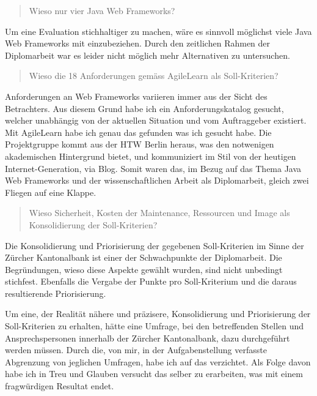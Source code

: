 \begin{quote}\begin{itshape}Wieso nur vier Java Web
Frameworks?\end{itshape}\end{quote}

Um eine Evaluation stichhaltiger zu machen, wäre es sinnvoll möglichst viele
Java Web Frameworks mit einzubeziehen. Durch den zeitlichen Rahmen der
Diplomarbeit war es leider nicht möglich mehr Alternativen zu untersuchen.
\newline

\begin{quote}\begin{itshape}Wieso die 18 Anforderungen gemäss AgileLearn als
Soll-Kriterien?\end{itshape}\end{quote}

Anforderungen an Web Frameworks variieren immer aus der Sicht des Betrachters.
Aus diesem Grund habe ich ein Anforderungskatalog gesucht, welcher unabhängig
von der aktuellen Situation und vom Auftraggeber existiert. Mit AgileLearn habe
ich genau das gefunden was ich gesucht habe. Die Projektgruppe kommt aus der HTW
Berlin heraus, was den notwenigen akademischen Hintergrund bietet, und
kommuniziert im Stil von der heutigen Internet-Generation, via Blog. Somit waren
das, im Bezug auf das Thema Java Web Frameworks und der wissenschaftlichen
Arbeit als Diplomarbeit, gleich zwei Fliegen auf eine Klappe.
\newline

\begin{quote}\begin{itshape}Wieso Sicherheit, Kosten der Maintenance, Ressourcen
und Image als Konsolidierung der Soll-Kriterien?\end{itshape}\end{quote}

Die Konsolidierung und Priorisierung der gegebenen Soll-Kriterien im Sinne der
Zürcher Kantonalbank ist einer der Schwachpunkte der Diplomarbeit. Die
Begründungen, wieso diese Aspekte gewählt wurden, sind nicht unbedingt
stichfest. Ebenfalls die Vergabe der Punkte pro Soll-Kriterium und die daraus
resultierende Priorisierung.

Um eine, der Realität nähere und präzisere, Konsolidierung und Priorisierung der
Soll-Kriterien zu erhalten, hätte eine Umfrage, bei den betreffenden Stellen und
Ansprechspersonen innerhalb der Zürcher Kantonalbank, dazu durchgeführt werden
müssen. Durch die, von mir, in der Aufgabenstellung verfasste Abgrenzung von
jeglichen Umfragen, habe ich auf das verzichtet. Als Folge davon habe ich in
Treu und Glauben versucht das selber zu erarbeiten, was mit einem fragwürdigen
Resultat endet.

